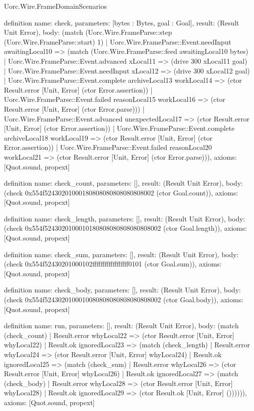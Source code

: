 \begin{lexlean}{Uorc.Wire.FrameDomainScenarios}
\begin{semanticmodule}
definition{
  name: check,
  parameters: [bytes : Bytes, goal : Goal],
  result: (Result Unit Error),
  body: (match (Uorc.Wire.FrameParse::step (Uorc.Wire.FrameParse::start) 1)
    | Uorc.Wire.FrameParse::Event.needInput awaitingLocal10 => (match (Uorc.Wire.FrameParse::feed awaitingLocal10 bytes)
      | Uorc.Wire.FrameParse::Event.advanced xLocal11 => (drive 300 xLocal11 goal)
      | Uorc.Wire.FrameParse::Event.needInput xLocal12 => (drive 300 xLocal12 goal)
      | Uorc.Wire.FrameParse::Event.complete archiveLocal13 workLocal14 => (ctor Result.error [Unit, Error] (ctor Error.assertion))
      | Uorc.Wire.FrameParse::Event.failed reasonLocal15 workLocal16 => (ctor Result.error [Unit, Error] (ctor Error.parse)))
    | Uorc.Wire.FrameParse::Event.advanced unexpectedLocal17 => (ctor Result.error [Unit, Error] (ctor Error.assertion))
    | Uorc.Wire.FrameParse::Event.complete archiveLocal18 workLocal19 => (ctor Result.error [Unit, Error] (ctor Error.assertion))
    | Uorc.Wire.FrameParse::Event.failed reasonLocal20 workLocal21 => (ctor Result.error [Unit, Error] (ctor Error.parse))),
  axioms: [Quot.sound, propext]
}

definition{
  name: check_count,
  parameters: [],
  result: (Result Unit Error),
  body: (check 0x554f52430201000180808080808080808002 (ctor Goal.count)),
  axioms: [Quot.sound, propext]
}

definition{
  name: check_length,
  parameters: [],
  result: (Result Unit Error),
  body: (check 0x554f5243020100010180808080808080808002 (ctor Goal.length)),
  axioms: [Quot.sound, propext]
}

definition{
  name: check_sum,
  parameters: [],
  result: (Result Unit Error),
  body: (check 0x554f52430201000102ffffffffffffffffff0101 (ctor Goal.sum)),
  axioms: [Quot.sound, propext]
}

definition{
  name: check_body,
  parameters: [],
  result: (Result Unit Error),
  body: (check 0x554f5243020100010080808080808080808002 (ctor Goal.body)),
  axioms: [Quot.sound, propext]
}

definition{
  name: run,
  parameters: [],
  result: (Result Unit Error),
  body: (match (check_count)
    | Result.error whyLocal22 => (ctor Result.error [Unit, Error] whyLocal22)
    | Result.ok ignoredLocal23 => (match (check_length)
      | Result.error whyLocal24 => (ctor Result.error [Unit, Error] whyLocal24)
      | Result.ok ignoredLocal25 => (match (check_sum)
        | Result.error whyLocal26 => (ctor Result.error [Unit, Error] whyLocal26)
        | Result.ok ignoredLocal27 => (match (check_body)
          | Result.error whyLocal28 => (ctor Result.error [Unit, Error] whyLocal28)
          | Result.ok ignoredLocal29 => (ctor Result.ok [Unit, Error] ()))))),
  axioms: [Quot.sound, propext]
}
\end{semanticmodule}
\end{lexlean}
